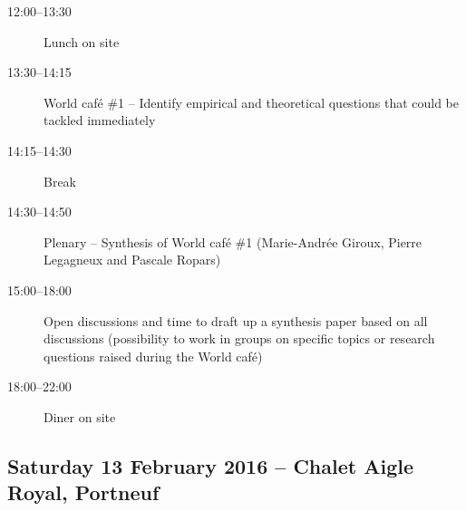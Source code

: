 \documentclass[10pt,letterpaper]{article}
\begin{document}
\begin{description}
    \item[12:00--13:30] Lunch on site

    \item[13:30--14:15] World café \#1 -- Identify empirical and theoretical questions that could be tackled immediately
    \item[14:15--14:30] Break
    \item[14:30--14:50] Plenary -- Synthesis of World café \#1 (Marie-Andrée Giroux, Pierre Legagneux and Pascale Ropars)
    \item[15:00--18:00] Open discussions and time to draft up a synthesis paper based on all discussions (possibility to work in groups on specific topics or research questions raised during the World café)
    \item[18:00--22:00] Diner on site

\end{description}

\vspace{0.35cm}

\subsection*{Saturday 13 February 2016 -- Chalet Aigle Royal, Portneuf}

\vspace{0.35cm}
\end{document}
